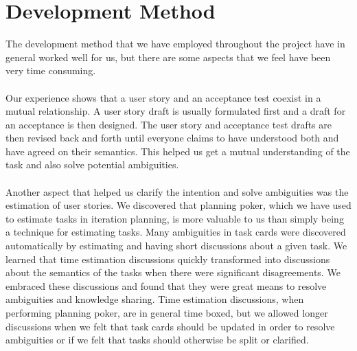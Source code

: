 
\section{Development Method}
The development method that we have employed throughout the project have in general worked well for us, but there are some aspects that we feel have been very time consuming. 
\\\\
Our experience shows that a user story and an acceptance test coexist in a mutual relationship. A user story draft is usually formulated first and a draft for an acceptance is then designed. The user story and acceptance test drafts are then revised back and forth until everyone claims to have understood both and have agreed on their semantics. This helped us get a mutual understanding of the task and also solve potential ambiguities. 
\\\\
Another aspect that helped us clarify the intention and solve ambiguities was the estimation of user stories. We discovered that planning poker, which we have used to estimate tasks in iteration planning, is more valuable to us than simply being a technique for estimating tasks. Many ambiguities in task cards were discovered automatically by estimating and having short discussions about a given task. We learned that time estimation discussions quickly transformed into discussions about the semantics of the tasks when there were significant disagreements. We embraced these discussions and found that they were great means to resolve ambiguities and knowledge sharing. Time estimation discussions, when performing planning poker, are in general time boxed, but we allowed longer discussions when we felt that task cards should be updated in order to resolve ambiguities or if we felt that tasks should otherwise be split or clarified.
\\\\
